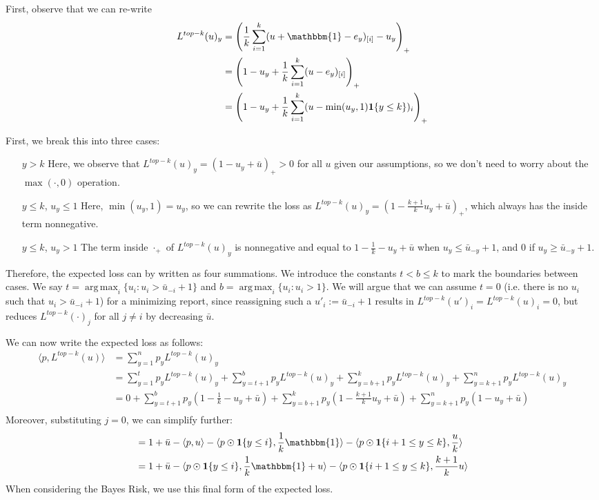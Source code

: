 \documentclass[12pt]{article}
\newcommand{\ubar}{\bar{u}}
\newcommand{\inprod}[2]{\langle #1, #2 \rangle}%
\newcommand{\ones}{\mathbbm{1}}
\newcommand{\Ind}[1]{\mathbf{1}\{#1\}}
\DeclareMathOperator*{\argmax}{arg\,max}
\begin{document}
First, observe that we can re-write
\begin{align*} 
L^{top-k}(u)_y&=\left(\frac{1}{k} \sum_{i=1}^k (u + \ones - e_y)_{[i]} - u_y \right)_+\\ 
&=\left(1 - u_y + \frac{1}{k} \sum_{i=1}^k (u - e_y)_{[i]} \right)_+\\
&=\left(1 - u_y + \frac{1}{k} \sum_{i=1}^k (u - \min(u_y, 1)\Ind{y \leq k})_{i} \right)_+\\
\end{align*}

First, we break this into three cases:
\begin{enumerate}
	\item [$y > k$] Here, we observe that $L^{top-k}(u)_y = (1-u_y + \bar{u})_+ > 0$ for all $u$ given our assumptions, so we don't need to worry about the $\max(\cdot,0)$ operation.
	\item [$y \leq k$, $u_y \leq 1$] Here, $\min(u_y,1) = u_y$, so we can rewrite the loss as $L^{top-k}(u)_y = (1 - \frac {k+1}{k} u_y + \bar u)_+$, which always has the inside term nonnegative.
	\item [$y \leq k$, $u_y > 1$] The term inside $\cdot_+$ of $L^{top-k}(u)_y$ is nonnegative and equal to $1 - \frac 1 k - u_y + \ubar$ when $u_y \leq \bar{u}_{-y} + 1$, and $0$ if $u_y \geq \bar{u}_{-y} + 1$.
\end{enumerate}

Therefore, the expected loss can by written as four summations.
We introduce the constants $t < b \leq k$ to mark the boundaries between cases.
We say $t = \argmax_i \{u_i : u_i > \bar u_{-i} +1\}$ and $b = \argmax_i \{u_i : u_i > 1\}$.
We will argue that we can assume $t = 0$ (i.e. there is no $u_i$ such that $u_i > \bar u_{-i} +1$) for a minimizing report, since reassigning such a $u'_i := \bar u_{-i} +1$ results in $L^{top-k}(u')_i = L^{top-k}(u)_i = 0$, but reduces $L^{top-k}(\cdot)_j$ for all $j \neq i$ by decreasing $\ubar$.

We can now write the expected loss as follows:
\begin{align*}
\inprod{p}{L^{top-k}(u)} &= \sum_{y=1}^n p_y L^{top-k}(u)_y \\
&= \sum_{y=1}^t p_y L^{top-k}(u)_y + \sum_{y=t+1}^b p_y L^{top-k}(u)_y + \sum_{y=b+1}^k p_y L^{top-k}(u)_y + \sum_{y=k+1}^n p_y L^{top-k}(u)_y\\
&= 0 + \sum_{y=t+1}^b p_y (1 - \frac 1 k - u_y + \ubar) + \sum_{y=b+1}^k p_y (1 - \frac{k+1} k u_y + \ubar) + \sum_{y=k+1}^n p_y(1-u_y + \ubar)\\
\end{align*}
Moreover, substituting $j=0$, we can simplify further:
\begin{align*}
&= 1 + \ubar - \inprod{p}{u} - \inprod{p \odot \Ind{y \leq i}}{\frac 1 k \ones} - \inprod{p \odot \Ind{i+1 \leq y \leq k}}{ \frac u k}\\
&= 1 + \ubar - \inprod{p \odot \Ind{y \leq i}}{\frac 1 k \ones + u} - \inprod{p \odot \Ind{i+1 \leq y \leq k}}{ \frac {k+1} k u}\\
\end{align*}
When considering the Bayes Risk, we use this final form of the expected loss.
\end{document}
